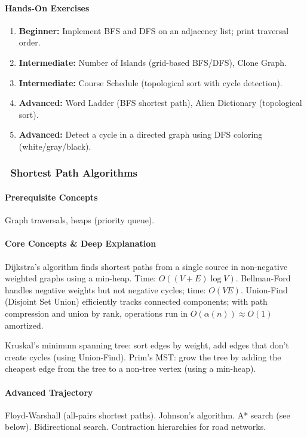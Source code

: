 \documentclass[11pt, a4paper, oneside]{report}
\newcommand{\mustmaster}[1]{\subsubsection{\texorpdfstring{\fcolorbox{blue!40!black}{blue!8}{\footnotesize\bfseries\color{blue!40!black} MUST MASTER}~#1}{#1}}}
\begin{document}
\paragraph{Hands-On Exercises}
\begin{enumerate}[leftmargin=*]
\item \textbf{Beginner:} Implement BFS and DFS on an adjacency list; print traversal order.
\item \textbf{Intermediate:} Number of Islands (grid-based BFS/DFS), Clone Graph.
\item \textbf{Intermediate:} Course Schedule (topological sort with cycle detection).
\item \textbf{Advanced:} Word Ladder (BFS shortest path), Alien Dictionary (topological sort).
\item \textbf{Advanced:} Detect a cycle in a directed graph using DFS coloring (white/gray/black).
\end{enumerate}

\mustmaster{Shortest Path Algorithms}

\paragraph{Prerequisite Concepts} Graph traversals, heaps (priority queue).

\paragraph{Core Concepts \& Deep Explanation} Dijkstra's algorithm finds shortest paths from a single source in non-negative weighted graphs using a min-heap. Time: $O((V+E) \log V)$. Bellman-Ford handles negative weights but not negative cycles; time: $O(VE)$. Union-Find (Disjoint Set Union) efficiently tracks connected components; with path compression and union by rank, operations run in $O(\alpha(n)) \approx O(1)$ amortized.

Kruskal's minimum spanning tree: sort edges by weight, add edges that don't create cycles (using Union-Find). Prim's MST: grow the tree by adding the cheapest edge from the tree to a non-tree vertex (using a min-heap).

\paragraph{Advanced Trajectory} Floyd-Warshall (all-pairs shortest paths). Johnson's algorithm. A* search (see below). Bidirectional search. Contraction hierarchies for road networks.
\end{document}
